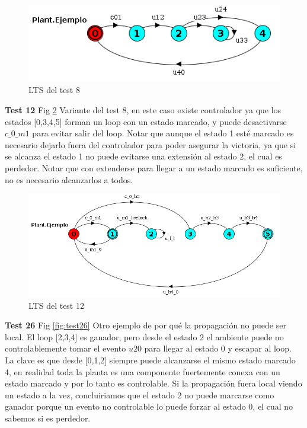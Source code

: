 \begin{figure}[h]
 \centering
 \includegraphics[scale=0.7]{figures/tests/test8.png}
 \caption{LTS del test 8}
 \label{fig:test8}
\end{figure}

\FloatBarrier
\textbf{Test 12} Fig \ref{fig:test12}
Variante del test 8, en este caso existe controlador ya que los estados [0,3,4,5] forman un loop con un estado marcado, y puede desactivarse $c\_0\_m1$ para evitar salir del loop. Notar que aunque el estado 1 esté marcado es necesario dejarlo fuera del controlador para poder asegurar la victoria, ya que si se alcanza el estado 1 no puede evitarse una extensión al estado 2, el cual es perdedor. Notar que con extenderse para llegar a un estado marcado es suficiente, no es necesario alcanzarlos a todos.
\begin{figure}[h]
 \centering
 \includegraphics[scale=0.6]{figures/tests/test12.png}
 \caption{LTS del test 12}
 \label{fig:test12}
\end{figure}

\FloatBarrier
\textbf{Test 26} Fig \ref{fig:test26} 
Otro ejemplo de por qué la propagación no puede ser local. El loop [2,3,4] es ganador, pero desde el estado 2 el ambiente puede no controlablemente tomar el evento $u20$ para llegar al estado 0 y escapar al loop. La clave es que desde [0,1,2] siempre puede alcanzarse el mismo estado marcado 4, en realidad toda la planta es una componente fuertemente conexa con un estado marcado y por lo tanto es controlable. 
Si la propagación fuera local viendo un estado a la vez, concluiriamos que el estado 2 no puede marcarse como ganador porque un evento no controlable lo puede forzar al estado 0, el cual no sabemos si es perdedor.


